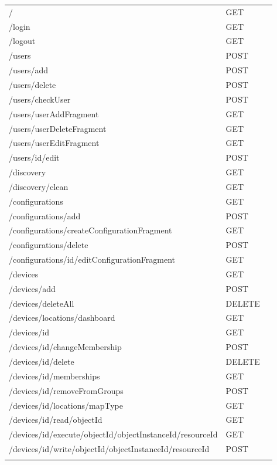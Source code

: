 \begin{longtable}{ p{11cm} p{4cm} l}
/	&	GET	 \\ \addlinespace
/login	&	GET	 \\ \addlinespace
/logout	&	GET	 \\ \addlinespace
/users	&	POST	 \\ \addlinespace
/users/add	&	POST	 \\ \addlinespace
/users/delete	&	POST	 \\ \addlinespace
/users/checkUser	&	POST	 \\ \addlinespace
/users/userAddFragment	&	GET	 \\ \addlinespace
/users/userDeleteFragment	&	GET	 \\ \addlinespace
/users/userEditFragment	&	GET	 \\ \addlinespace
/users/{id}/edit	&	POST	 \\ \addlinespace
/discovery	&	GET	 \\ \addlinespace
/discovery/clean	&	GET	 \\ \addlinespace
/configurations	&	GET	 \\ \addlinespace
/configurations/add	&	POST	 \\ \addlinespace
/configurations/createConfigurationFragment	&	GET	 \\ \addlinespace
/configurations/delete	&	POST	 \\ \addlinespace
/configurations/{id}/editConfigurationFragment	&	GET	 \\ \addlinespace
/devices	&	GET	 \\ \addlinespace
/devices/add	&	POST	 \\ \addlinespace
/devices/deleteAll	&	DELETE	 \\ \addlinespace
/devices/locations/dashboard	&	GET	 \\ \addlinespace
/devices/{id}	&	GET	 \\ \addlinespace
/devices/{id}/changeMembership	&	POST	 \\ \addlinespace
/devices/{id}/delete	&	DELETE	 \\ \addlinespace
/devices/{id}/memberships	&	GET	 \\ \addlinespace
/devices/{id}/removeFromGroups	&	POST	 \\ \addlinespace
/devices/{id}/locations/{mapType}	&	GET	 \\ \addlinespace
/devices/{id}/read/{objectId}	&	GET	 \\ \addlinespace
/devices/{id}/execute/{objectId}/{objectInstanceId}/{resourceId}	&	GET	 \\ \addlinespace
/devices/{id}/write/{objectId}/{objectInstanceId}/{resourceId}	&	POST	 \\ \addlinespace

\end{longtable}
